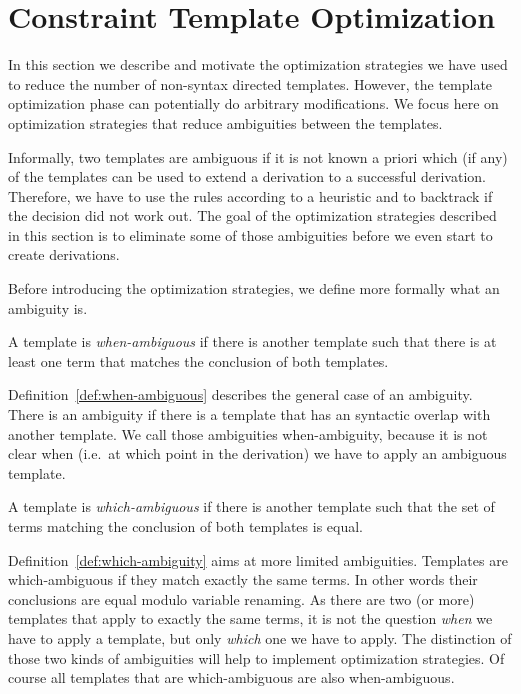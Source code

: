\section{Constraint Template Optimization}
\label{sec:constr-templ-optim}
In this section we describe and motivate the optimization strategies
we have used to reduce the number of non-syntax directed
templates. However, the template optimization phase can potentially do
arbitrary modifications. We focus here on optimization strategies that
reduce ambiguities between the templates.

Informally, two templates are ambiguous if it is not known a priori
which (if any) of the templates can be used to extend a derivation to
a successful derivation. Therefore, we have to use the rules according
to a heuristic and to backtrack if the decision did not work out. The
goal of the optimization strategies described in this section is to
eliminate some of those ambiguities before we even start to create
derivations.

Before introducing the optimization strategies, we define more
formally what an ambiguity is.

\begin{definition}
  A template is \textit{when-ambiguous} if there is another template
  such that there is at least one term that matches the conclusion of
  both templates.
\label{def:when-ambiguous}
\end{definition}

Definition~\ref{def:when-ambiguous} describes the general case of an
ambiguity. There is an ambiguity if there is a template that has an
syntactic overlap with another template. We call those ambiguities
when-ambiguity, because it is not clear when (i.e.\ at which point in
the derivation) we have to apply an ambiguous template.

\begin{definition}
  A template is \textit{which-ambiguous} if there is another template
  such that the set of terms matching the conclusion of both templates
  is equal.
\label{def:which-ambiguity}
\end{definition}

Definition~\ref{def:which-ambiguity} aims at more limited
ambiguities. Templates are which-ambiguous if they match exactly the
same terms. In other words their conclusions are equal modulo variable
renaming. As there are two (or more) templates that apply to exactly
the same terms, it is not the question \textit{when} we have to apply
a template, but only \textit{which} one we have to apply. The
distinction of those two kinds of ambiguities will help to implement
optimization strategies. Of course all templates that are
which-ambiguous are also when-ambiguous.

